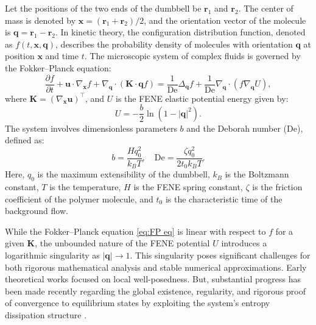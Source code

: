 \documentclass[preprint,12pt]{elsarticle}
\begin{document}
Let the positions of the two ends of the dumbbell be $\bm{r}_1$ and $\bm{r}_2$. The center of mass is denoted by $\bm{x}=(\bm{r}_1+\bm{r}_2)/2$, and the orientation vector of the molecule is $\bm{q}=\bm{r}_1-\bm{r}_2$. In kinetic theory, the configuration distribution function, denoted as $f(t,\bm{x},\bm{q})$, describes the probability density of molecules with orientation $\bm{q}$ at position $\bm{x}$ and time $t$. The microscopic system of complex fluids is governed by the Fokker--Planck equation:
\begin{equation}
    \frac{\partial f}{\partial t}+\boldsymbol{u}\cdot\nabla_{\bm{x}}f+\nabla_{\bm{q}}\cdot(\bm{K}\cdot \bm{q}f)=\frac{1}{\text{De}}\Delta_{\bm{q}}f+\frac{1}{\text{De}}\nabla_{\bm{q}}\cdot\left(f\nabla_{\bm{q}}U\right),\label{eq:FP eq}
\end{equation}
where $\bm{K}=(\nabla_{\bm{x}}\bm{u})^\top$, and $U$ is the FENE elastic potential energy given by:
\begin{equation}
    U=-\frac{b}{2}\ln(1-|\bm{q}|^2).
\end{equation}
The system involves dimensionless parameters $b$ and the Deborah number ($\text{De}$), defined as:
\begin{equation}
    b=\frac{Hq_0^2}{k_BT},\quad \text{De}=\frac{\zeta q_0^2}{2t_0k_BT}.
\end{equation}
Here, $q_0$ is the maximum extensibility of the dumbbell, $k_B$ is the Boltzmann constant, $T$ is the temperature, $H$ is the FENE spring constant, $\zeta$ is the friction coefficient of the polymer molecule, and $t_0$ is the characteristic time of the background flow.

While the Fokker--Planck equation \eqref{eq:FP eq} is linear with respect to $f$ for a given $\bm{K}$, the unbounded nature of the FENE potential $U$ introduces a logarithmic singularity as $|\bm{q}| \to 1$. This singularity poses significant challenges for both rigorous mathematical analysis and stable numerical approximations. Early theoretical works focused on local well-posedness. But, substantial progress has been made recently regarding the global existence, regularity, and rigorous proof of convergence to equilibrium states by exploiting the system's entropy dissipation structure \cite{Blaustein24,Yang22,Masmoudi13}.
\end{document}
